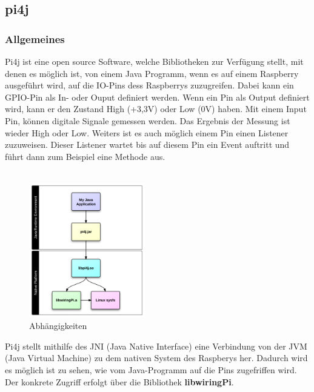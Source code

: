\subsection{pi4j} \label{subsec:pi4j}
\subsubsection{Allgemeines}
Pi4j ist eine open source Software, welche Bibliotheken zur Verfügung stellt, mit denen es möglich ist, von einem Java Programm, wenn es auf einem Raspberry ausgeführt wird, auf die IO-Pins dess Raspberrys zuzugreifen. Dabei kann ein GPIO-Pin als In- oder Ouput definiert werden. Wenn ein Pin als Output definiert wird, kann er den Zustand High (+3,3V) oder Low (0V) haben. Mit einem Input Pin, können digitale Signale gemessen werden. Das Ergebnis der Messung ist wieder High oder Low. Weiters ist es auch möglich einem Pin einen Listener zuzuweisen. Dieser Listener wartet bis auf diesem Pin ein Event auftritt und führt dann zum Beispiel eine Methode aus. 
\\ \\

\begin{figure}
\vspace{-35pt}
  \begin{center}
    \includegraphics[width=0.45\textwidth]{Bilder/pi4j/dependencies}
  \end{center}
  \caption[Abhängigkeiten]{Abhängigkeiten\protect\footnotemark}
  \label{Abhaengigkeiten}
  \vspace{-160pt}
\end{figure}


Pi4j stellt mithilfe des JNI (Java Native Interface) eine Verbindung von der JVM (Java Virtual Machine) zu dem nativen System des Raspberys her. Dadurch wird es möglich ist zu sehen, wie vom Java-Programm auf die Pins zugefriffen wird.
\\ Der konkrete Zugriff erfolgt über die Bibliothek \textbf{libwiringPi}.


